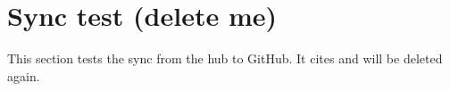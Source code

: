 \section{Sync test (delete me)}

This section tests the sync from the hub to GitHub.
It cites \citet{gomezguillen2026agentic} and will be deleted again.
